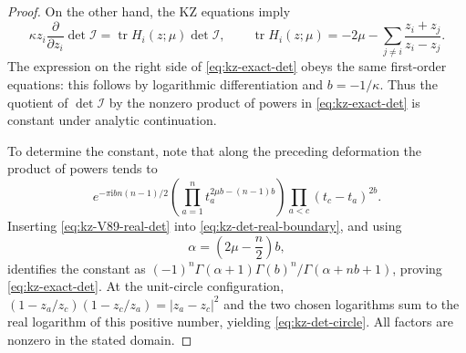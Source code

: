 \documentclass[12pt]{amsart}
\theoremstyle{definition}
\numberwithin{equation}{section}
\theoremstyle{definition}
\let\mc\mathcal
\let\ka\kappa
\let\on\operatorname
\def\tr{\on{tr}}
\begin{document}
\begin{proof}
On the other hand, the KZ equations imply
\[
 \ka z_i\frac{\partial}{\partial z_i}\det\mc I
 =\tr H_i(z;\mu)\det\mc I,
 \qquad
 \tr H_i(z;\mu)=-2\mu-
 \sum_{j\ne i}\frac{z_i+z_j}{z_i-z_j}.
\]
The expression on the right side of \eqref{eq:kz-exact-det}
obeys the same first-order equations: this follows by
logarithmic differentiation and $b=-1/\ka$.
Thus the quotient of $\det\mc I$ by the nonzero product of
powers in \eqref{eq:kz-exact-det} is constant under analytic
continuation.

To determine the constant, note that along the preceding
deformation the product of powers tends to
\[
 e^{-\pi\mathrm{i}b n(n-1)/2}
 \left(\prod_{a=1}^n t_a^{2\mu b-(n-1)b}\right)
 \prod_{a<c}(t_c-t_a)^{2b}.
\]
Inserting \eqref{eq:kz-V89-real-det} into
\eqref{eq:kz-det-real-boundary}, and using
\[
 \alpha=\left(2\mu-\frac n2\right)b,
\]
identifies the constant as
$(-1)^n\Gamma(\alpha+1)\Gamma(b)^n/
\Gamma(\alpha+nb+1)$, proving
\eqref{eq:kz-exact-det}.
At the unit-circle configuration,
$(1-z_a/z_c)(1-z_c/z_a)=|z_a-z_c|^2$ and the two
chosen logarithms sum to the real logarithm of this
positive number, yielding \eqref{eq:kz-det-circle}.
All factors are nonzero in the stated domain.
\end{proof}
\end{document}
